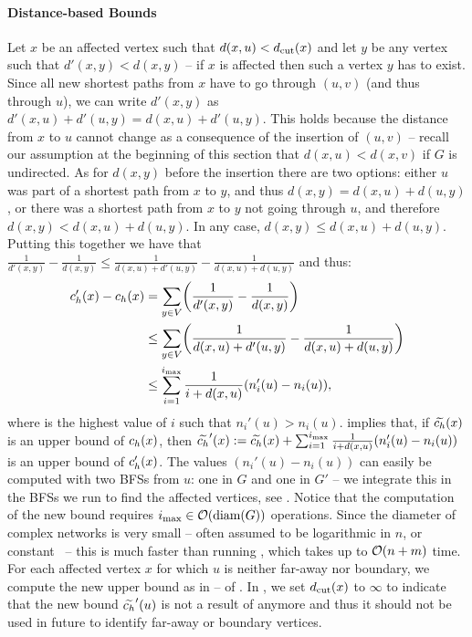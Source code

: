 \paragraph{Distance-based Bounds}
%
Let $x$ be an affected vertex such that $d(x, u) < d_{\text{cut}}(x)$ and
let $y$ be any vertex such that $d'(x, y) < d(x, y)$ -- if $x$ is affected
then such a vertex $y$ has to exist.
Since all new shortest paths from $x$ have to go through $(u, v)$ (and thus
through $u$), we can write $d'(x, y)$ as $d'(x, u) + d'(u, y) = d(x, u) + d'(u, y)$.
This holds because the distance from $x$ to $u$ cannot change as a consequence
of the insertion of $(u, v)$ -- recall our assumption at the beginning of this section
that $d(x, u) < d(x, v)$ if $G$ is undirected.
%
As for $d(x, y)$ before the insertion there are two options: either $u$ was
part of a shortest path from $x$ to $y$, and thus $d(x, y) = d(x, u) + d(u, y)$,
or there was a shortest path from $x$ to $y$ not going through $u$, and therefore
$d(x, y) < d(x, u) + d(u, y)$. In any case, $d(x, y) \le d(x, u) + d(u, y)$.
Putting this together we have that
$\frac{1}{d'(x, y)} - \frac{1}{d(x, y)} \le \frac{1}{d(x, u) + d'(u, y)} -
\frac{1}{d(x, u) + d(u, y)}$ and thus:
%
\begin{equation}
\label{eq:nbcut-dist-based-bound}
\begin{split}
\harm'(x) - \harm(x)
&= \sum_{y \in V}\roundb{\frac{1}{d'(x, y)} - \frac{1}{d(x, y)}}\\
&\le \sum_{y \in V}\roundb{\frac{1}{d(x, u) + d'(u, y)} - \frac{1}{d(x, u) + d(u, y)}}\\
&\le \sum_{i = 1}^{\imax}\frac{1}{i + d(x, u)}(n_i'(u) - n_i(u)),
\end{split}
\end{equation}
%
where \imax is the highest value of $i$ such that $n_i'(u) > n_i(u)$.
 implies that, if $\widetilde{c_h}(x)$ is an upper bound
of $c_h(x)$, then
$\widetilde{c_h}'(x) := \widetilde{c_h}(x) +
\sum_{i = 1}^{i_{\max}}\frac{1}{i + d(x, u)}(n_i'(u) - n_i(u))$
is an upper bound of $c_h'(x)$.
The values $(n_i'(u) - n_i(u))$ can easily be computed with two BFSs from $u$:
one in $G$ and one in $G'$ -- we integrate this in the BFSs we run to find
the affected vertices, see .
Notice that the computation of the new bound requires
$i_{\max} \in \mathcal{O}(\text{diam}(G))$ operations. Since the diameter of complex networks is
very small -- often assumed to be logarithmic in $n$, or
constant~\cite{song2005self,DBLP:journals/corr/cond-mat-9907038}
-- this is much faster than running \bfscut, which takes up to
$\mathcal{O}(n + m)$ time.
For each affected vertex $x$ for which $u$ is neither far-away nor boundary,
we compute the new upper bound as in  --
 of .
In , we set $d_{\text{cut}}(x)$ to $\infty$ to
indicate that the new bound $\widetilde{c_h}'(u)$ is not a result of \nbcut anymore
and thus it should not be used in future to identify far-away or boundary
vertices.

